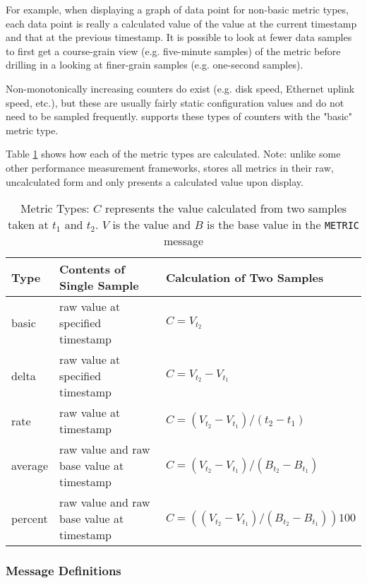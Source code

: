 For example, when displaying a graph of data point for non-basic metric types, each data point is really a calculated
value of the value at the current timestamp and that at the previous timestamp. It is possible to look at fewer data
samples to first get a course-grain view (e.g. five-minute samples) of the metric before drilling in a looking at
finer-grain samples (e.g. one-second samples).

Non-monotonically increasing counters do exist (e.g. disk speed, Ethernet uplink speed, etc.), but these are usually
fairly static configuration values and do not need to be sampled frequently. \dcamp supports these types of counters
with the "basic" metric type.

Table \ref{tab:metric_types} shows how each of the \dcamp metric types are calculated. Note: unlike some other
performance measurement frameworks\cite{ganglia}, \dcamp stores all metrics in their raw, uncalculated form and only
presents a calculated value upon display.

\begin{table}
\begin{tabular}{|l|l|l|}
\hline
\textbf{Type} & \textbf{Contents of Single Sample} & \textbf{Calculation of Two Samples}
\\
\hline
basic & raw value at specified timestamp & \( C = V_{t_2} \)
\\
\hline
delta & raw value at specified timestamp & \( C = V_{t_2} - V_{t_1} \)
\\
\hline
rate & raw value at timestamp & \( C = (V_{t_2} - V_{t_1}) / (t_2 - t_1) \)
\\
\hline
average & raw value and raw base value at timestamp & \( C = (V_{t_2} - V_{t_1}) / (B_{t_2} - B_{t_1}) \)
\\
\hline
percent & raw value and raw base value at timestamp & \( C = ( (V_{t_2} - V_{t_1}) / (B_{t_2} - B_{t_1}) ) 100 \)
\\
\hline
\end{tabular}
\caption[Metric Types]
        {Metric Types: \(C\) represents the value calculated from two samples taken at \(t_1\) and \(t_2\). \(V\) is the
	 value and \(B\) is the base value in the \texttt{METRIC} message}
\label{tab:metric_types}
\end{table}

\subsubsection{Message Definitions}


